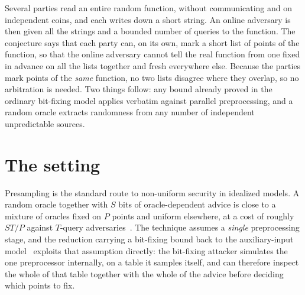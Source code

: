 \documentclass{conjura-conjecture}
\begin{document}

\vspace{0.4em}

\begin{informalconjecture}
Several parties read an entire random function, without communicating and
on independent coins, and each writes down a short string. An online
adversary is then given all the strings and a bounded number of queries to
the function. The conjecture says that each party can, on its own, mark a
short list of points of the function, so that the online adversary cannot
tell the real function from one fixed in advance on all the lists together
and fresh everywhere else. Because the parties mark points of the
\emph{same} function, no two lists disagree where they overlap, so no
arbitration is needed. Two things follow: any bound already proved in the
ordinary bit-fixing model applies verbatim against parallel preprocessing,
and a random oracle extracts randomness from any number of independent
unpredictable sources.
\end{informalconjecture}

\section{The setting}\label{sec:setting}

Presampling is the standard route to non-uniform security in idealized
models. A random oracle together with $S$ bits of oracle-dependent advice
is close to a mixture of oracles fixed on $P$ points and uniform
elsewhere, at a cost of roughly $ST/P$ against $T$-query
adversaries~\cite{Unruh,DGK,CDGS}. The technique assumes a \emph{single}
preprocessing stage, and the reduction carrying a bit-fixing bound back to
the auxiliary-input model~\cite[Thm.~5]{CDGS} exploits that assumption
directly: the bit-fixing attacker simulates the one preprocessor
internally, on a table it samples itself, and can therefore inspect the
whole of that table together with the whole of the advice before deciding
which points to fix.
\end{document}
